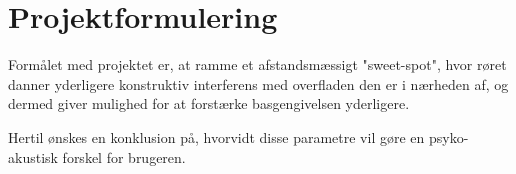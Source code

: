 \chapter{Projektformulering}

Formålet med projektet er, at ramme et afstandsmæssigt "sweet-spot", hvor røret danner yderligere konstruktiv interferens med overfladen den er i nærheden af, og dermed giver mulighed for at forstærke basgengivelsen yderligere. 

Hertil ønskes en konklusion på, hvorvidt disse parametre vil gøre en psyko-akustisk forskel for brugeren. 